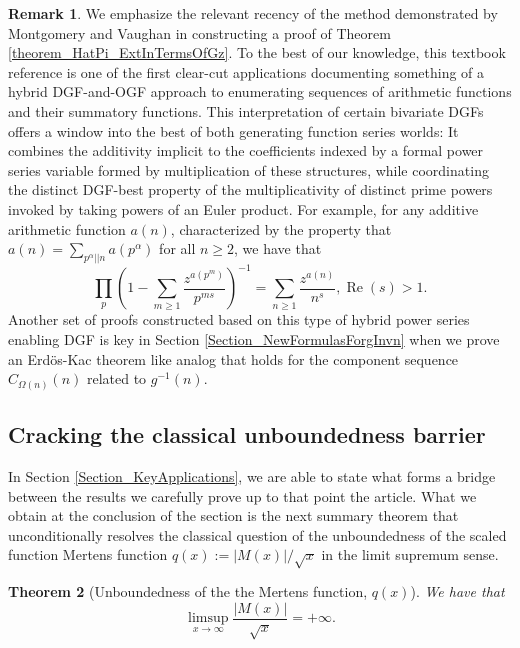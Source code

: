 \documentclass[11pt,reqno,a4letter]{article}
\numberwithin{figure}{section}
\numberwithin{table}{section}
\newcommand{\cf}{\textit{cf.\ }}
\theoremstyle{plain}
\newtheorem{theorem}{Theorem}
\numberwithin{theorem}{section}
\theoremstyle{definition}
\newtheorem{remark}[theorem]{Remark}
\renewcommand{\Re}{\operatorname{Re}}
\begin{document}
\begin{remark} 
\label{remark_MV_NewDGFApplications} 
We emphasize the relevant recency of the method demonstrated by 
Montgomery and Vaughan in constructing a proof of 
Theorem \ref{theorem_HatPi_ExtInTermsOfGz}. 
To the best of our knowledge, this textbook reference is 
one of the first clear-cut applications documenting something of a hybrid 
DGF-and-OGF approach to enumerating sequences of arithmetic functions 
and their summatory functions. 
This interpretation of certain bivariate DGFs 
offers a window into the best of both generating function series worlds: 
It combines the additivity 
implicit to the coefficients indexed by a formal power series variable formed by 
multiplication of these structures, while coordinating the distinct DGF-best 
property of the multiplicativity of distinct prime powers invoked 
by taking powers of an Euler product. 
For example, for any additive arithmetic function $a(n)$, 
characterized by the property that 
$a(n) = \sum_{p^{\alpha} || n} a(p^{\alpha})$ for all $n \geq 2$, we have that 
\cite[\cf \S 1.7]{IWANIEC-KOWALSKI} 
\[
\prod_p \left( 
     1 - \sum_{m \geq 1} \frac{z^{a(p^m)}}{p^{ms}}\right)^{-1} = 
     \sum_{n \geq 1} \frac{z^{a(n)}}{n^s}, \Re(s) > 1. 
\]
Another set of proofs constructed based on this type of hybrid power series enabling 
DGF is key in Section \ref{Section_NewFormulasForgInvn} 
when we prove an Erd\"os-Kac theorem like analog 
that holds for the component sequence $C_{\Omega(n)}(n)$ related to $g^{-1}(n)$. 
\end{remark} 

\subsection{Cracking the classical unboundedness barrier} 

In Section \ref{Section_KeyApplications}, 
we are able to state what forms a bridge between the results 
we carefully prove up to that point the article. 
What we obtain at the conclusion of the section 
is the next summary theorem that unconditionally 
resolves the classical question of the 
unboundedness of the scaled function Mertens function 
$q(x) := |M(x)| / \sqrt{x}$ in the limit supremum sense. 

\begin{theorem}[Unboundedness of the the Mertens function, $q(x)$] 
\label{cor_ThePipeDreamResult_v1} 
We have that 
\[
\limsup_{x \rightarrow \infty} \frac{|M(x)|}{\sqrt{x}} = +\infty. 
\]
\end{theorem} 
\end{document}
